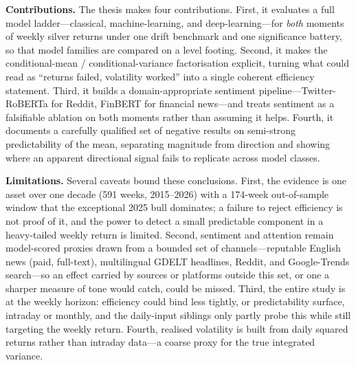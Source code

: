 \documentclass[12pt, a4paper]{article}
\begin{document}
\textbf{Contributions.} The thesis makes four contributions. First, it evaluates a full
model ladder---classical, machine-learning, and deep-learning---for \emph{both} moments
of weekly silver returns under one drift benchmark and one significance battery, so that
model families are compared on a level footing. Second, it makes the
conditional-mean / conditional-variance factorisation
explicit, turning what could read as ``returns failed, volatility worked'' into a single
coherent efficiency statement. Third, it builds a domain-appropriate sentiment
pipeline---Twitter-RoBERTa for Reddit, FinBERT for financial news---and treats sentiment
as a falsifiable ablation on both moments rather than assuming it helps. Fourth, it
documents a carefully qualified set of negative results on semi-strong predictability of
the mean, separating magnitude from direction and showing where an apparent directional
signal fails to replicate across model classes.

\textbf{Limitations.} Several caveats bound these conclusions. First, the evidence is one
asset over one decade (591 weeks, 2015--2026) with a 174-week out-of-sample window that the
exceptional 2025 bull dominates; a failure to reject efficiency is not proof of it, and the
power to detect a small predictable component in a heavy-tailed weekly return is limited.
Second, sentiment and attention remain model-scored proxies drawn from a bounded set of
channels---reputable English news (paid, full-text), multilingual GDELT headlines, Reddit, and
Google-Trends search---so an effect carried by sources or platforms outside this set, or one a
sharper measure of tone would catch, could be missed. Third, the entire study is at the weekly
horizon: efficiency could bind less tightly, or predictability surface, intraday or monthly,
and the daily-input siblings only partly probe this while still targeting the weekly return.
Fourth, realised volatility is built from daily squared returns rather than intraday data---a
coarse proxy for the true integrated variance.
\end{document}
